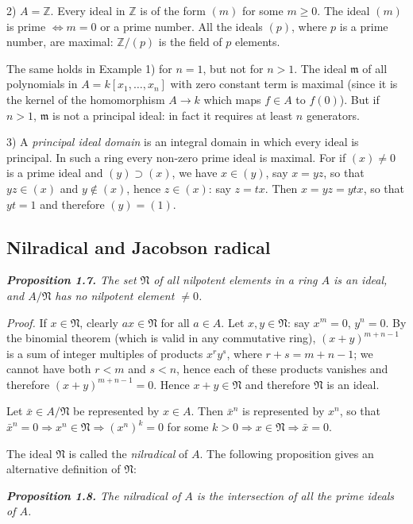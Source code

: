2) $A=\mathbb Z$.  Every ideal in $\mathbb Z$ is of the form $(m)$ for some $m\geq0$.  The ideal
$(m)$ is prime $\Longleftrightarrow m=0$ or a prime number.  All the ideals $(p)$, where $p$ is a prime
number, are maximal: $\mathbb Z/(p)$ is the field of $p$ elements.

The same holds in Example 1) for $n=1$, but not for $n>1$.  The ideal $\mathfrak m$ of
all polynomials in $A=k[x_1,\ldots,x_n]$ with zero constant term is maximal (since
it is the kernel of the homomorphism $A\longrightarrow k$ which maps $f\in A$ to $f(0)$).  But if
$n>1$, $\mathfrak m$ is not a principal ideal: in fact it requires at least $n$ generators.

3) A \emph{principal ideal domain} is an integral domain in which every ideal is
principal.  In such a ring every non-zero prime ideal is maximal.  For if $(x)\ne0$
is a prime ideal and $(y)\supset(x)$, we have $x\in(y)$, say $x=yz$, so that $yz\in(x)$ and
$y\notin(x)$, hence $z\in(x)$: say $z=tx$.  Then $x=yz=ytx$, so that $yt=1$ and
therefore $(y)=(1)$.

\subsection{Nilradical and Jacobson radical}

\medskip
\noindent\textit{\textbf{Proposition 1.7.} The set $\mathfrak N$ of all nilpotent elements in a ring $A$ is an ideal,
and $A/\mathfrak N$ has no nilpotent element $\ne0$.}

\noindent\emph{Proof.}  If $x\in\mathfrak N$, clearly $ax\in\mathfrak N$ for all $a\in A$.  Let $x,y\in\mathfrak N$: say $x^m=0$, $y^n=0$.
By the binomial theorem (which is valid in any commutative ring), $(x+y)^{m+n-1}$
is a sum of integer multiples of products $x^ry^s$, where $r+s=m+n-1$; we
cannot have both $r<m$ and $s<n$, hence each of these products vanishes and
therefore $(x+y)^{m+n-1}=0$.  Hence $x+y\in\mathfrak N$ and therefore $\mathfrak N$ is an ideal.

Let $\bar{x}\in A/\mathfrak N$ be represented by $x\in A$.  Then $\bar{x}^n$ is represented by $x^n$, so that
$\bar{x}^n=0\Rightarrow x^n\in\mathfrak N\Rightarrow(x^n)^k=0$ for some $k>0\Rightarrow x\in\mathfrak N\Rightarrow\bar{x}=0$.\proofbox

The ideal $\mathfrak N$ is called the \emph{nilradical} of $A$.  The following proposition gives an
alternative definition of $\mathfrak N$:

\medskip
\noindent\textit{\textbf{Proposition 1.8.} The nilradical of $A$ is the intersection of all the prime ideals
of $A$.}

